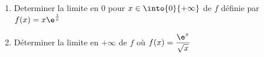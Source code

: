 \begin{exercice}

 \begin{enumerate}
  \item Determiner la limite en 0 pour $x\in\into{0}{+\infty}$ de $f$
    d\'efinie par 
$f(x)=x\e^{\frac{1}{x}}$
\item D\'eterminer la limite en $+\infty$ de $f$ o\`u
  $f(x)=\dfrac{\e^x}{\sqrt x}$
  \end{enumerate}
\end{exercice}
